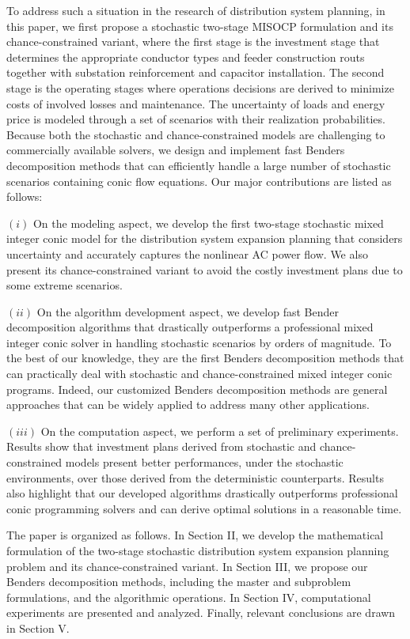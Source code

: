 \documentclass[journal]{IEEEtran}
\theoremstyle{remark}
\begin{document}
 To  address such a situation in the research of distribution system planning, in this paper, we first propose a stochastic two-stage MISOCP formulation and its chance-constrained variant, where the first stage is the investment stage that determines the appropriate conductor types and feeder construction routs together with substation reinforcement and capacitor installation. The second stage is the operating stages where operations decisions are derived to minimize costs of involved losses and maintenance. The uncertainty of loads and energy price is modeled through a set of scenarios with their realization probabilities. Because both the stochastic and chance-constrained models are challenging to commercially available solvers, we design and implement fast Benders decomposition methods that can efficiently handle a large number of  stochastic scenarios containing conic flow equations. Our major contributions are listed as follows:\par
 $(i)$ On the modeling aspect, we develop the first two-stage stochastic mixed integer conic model for the distribution system expansion planning that considers uncertainty and accurately captures the nonlinear AC power flow. We also present its chance-constrained variant to avoid the costly investment plans due to some extreme scenarios.\par
$(ii)$ On the algorithm development aspect, we develop fast Bender decomposition algorithms that drastically outperforms a professional mixed integer conic solver in handling stochastic scenarios  by orders of magnitude. To the best of our knowledge, they are the first Benders decomposition methods that can practically deal with stochastic and chance-constrained mixed integer conic programs. Indeed, our customized Benders decomposition methods are general approaches that can be widely applied to address many other applications.\par
$(iii)$ On the computation aspect, we perform a set of preliminary experiments. Results show that  investment plans derived from stochastic and chance-constrained models
present better performances, under the stochastic environments, over those derived from the deterministic counterparts. Results also highlight that our developed algorithms drastically outperforms professional conic programming solvers and can derive optimal solutions in a reasonable time.\par

The paper is organized as follows. In Section II, we develop the mathematical formulation of the two-stage stochastic distribution system expansion planning problem and its chance-constrained variant. In Section III, we propose our Benders decomposition methods, including the master and subproblem formulations, and the algorithmic operations. In Section IV, computational experiments are presented and analyzed. Finally, relevant conclusions are drawn in Section V.
\end{document}
